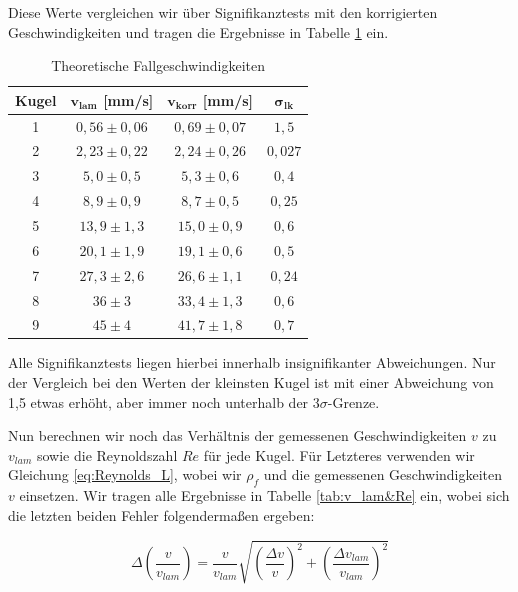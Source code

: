 \documentclass{article}
\begin{document}
Diese Werte vergleichen wir über Signifikanztests mit den korrigierten Geschwindigkeiten und tragen die Ergebnisse in Tabelle \ref{tab:v_lam} ein.

\phantom{.}

\begin{table}[!h]
    \centering
    \begin{tabular}{cccc}
        \hline
        \textbf{Kugel} & $\bm{v_{lam}}$ [mm/s] & $\bm{v_{korr}}$ [mm/s] & $\bm{\sigma_{lk}}$  \\ \hline
        1 & $0,56 \pm 0,06$ & $0,69 \pm 0,07$ & $1,5$     \\
        2 & $2,23 \pm 0,22$ & $2,24 \pm 0,26$ & $0,027$     \\
        3 & $5,0 \pm 0,5$   & $5,3 \pm 0,6$ & $0,4$     \\
        4 & $8,9 \pm 0,9$   & $8,7 \pm 0,5$ & $0,25$     \\
        5 & $13,9 \pm 1,3$  & $15,0 \pm 0,9$ & $0,6$     \\
        6 & $20,1 \pm 1,9$  & $19,1 \pm 0,6$ & $0,5$     \\
        7 & $27,3 \pm 2,6$  & $26,6 \pm 1,1$ & $0,24$     \\
        8 & $36 \pm 3$      & $33,4 \pm 1,3$ & $0,6$     \\
        9 & $45 \pm 4$      & $41,7 \pm 1,8$ & $0,7$     \\ \hline
    \end{tabular}%
    \caption{Theoretische Fallgeschwindigkeiten}
    \label{tab:v_lam}
\end{table}

\phantom{.}

Alle Signifikanztests liegen hierbei innerhalb insignifikanter Abweichungen. Nur der Vergleich bei den Werten der kleinsten Kugel ist mit einer Abweichung von 1,5 etwas erhöht, aber immer noch unterhalb der $3\sigma$-Grenze.

Nun berechnen wir noch das Verhältnis der gemessenen Geschwindigkeiten $v$ zu $v_{lam}$ sowie die Reynoldszahl $Re$ für jede Kugel. Für Letzteres verwenden wir Gleichung \ref{eq:Reynolds_L}, wobei wir $\rho_f$ und die gemessenen Geschwindigkeiten $v$ einsetzen. Wir tragen alle Ergebnisse in Tabelle \ref{tab:v_lam&Re} ein, wobei sich die letzten beiden Fehler folgendermaßen ergeben:

\begin{equation}
    \Delta \left( \frac{v}{v_{lam}} \right) =  \frac{v}{v_{lam}} \sqrt{\left( \frac{\Delta v}{v} \right)^2 + \left( \frac{\Delta v_{lam}}{v_{lam}} \right)^2}
\end{equation}
\end{document}
